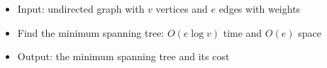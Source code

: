 \begin{itemize}
	\item Input: undirected graph with $v$ vertices and $e$ edges with weights
	\item Find the minimum spanning tree: $O(e\log{v})$ time and $O(e)$ space
	\item Output: the minimum spanning tree and its cost
\end{itemize}
